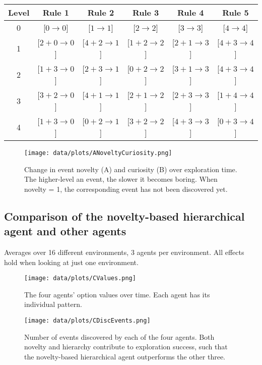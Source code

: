 \documentclass{article}
\begin{document}
\begin{center}
 \begin{tabular}{|c | c c c c c|} 
 \hline
 Level & Rule 1 & Rule 2 & Rule 3 & Rule 4 & Rule 5 \\ [0.5ex] 
 \hline
 0 & [$0 \rightarrow 0$] & [$1 \rightarrow 1$] & [$2 \rightarrow 2$] & [$3 \rightarrow 3$] & [$4 \rightarrow 4$] \\ 
 \hline
 1 & [$2 + 0 \rightarrow 0$] & [$4 + 2 \rightarrow 1$] & [$1 + 2 \rightarrow 2$] & [$2 + 1 \rightarrow 3$] & [$4 + 3 \rightarrow 4$] \\ 
 \hline
 2 & [$1 + 3 \rightarrow 0$] & [$2 + 3 \rightarrow 1$] & [$0 + 2 \rightarrow 2$] & [$3 + 1 \rightarrow 3$] & [$4 + 3 \rightarrow 4$] \\ 
 \hline
 3 & [$3 + 2 \rightarrow 0$] & [$4 + 1 \rightarrow 1$] & [$2 + 1 \rightarrow 2$] & [$2 + 3 \rightarrow 3$] & [$1 + 4 \rightarrow 4$] \\ 
 \hline
 4 & [$1 + 3 \rightarrow 0$] & [$0 + 2 \rightarrow 1$] & [$3 + 2 \rightarrow 2$] & [$4 + 3 \rightarrow 3$] & [$0 + 3 \rightarrow 4$] \\ 
 \hline
 \end{tabular}
\end{center}

\begin{figure}[h]
	\centering
	\texttt{[image: data/plots/ANoveltyCuriosity.png]}
	\caption{Change in event novelty (A) and curiosity (B) over exploration time. The higher-level an event, the slower it becomes boring. When novelty = 1, the corresponding event has not been discovered yet.}
	\label{TaskFigure}
\end{figure}

\subsection{Comparison of the novelty-based hierarchical agent and other agents}

Averages over 16 different environments, 3 agents per environment. All effects hold when looking at just one environment.

\begin{figure}[h]
	\centering
	\texttt{[image: data/plots/CValues.png]}
	\caption{The four agents' option values over time. Each agent has its individual pattern.}
	\label{TaskFigure}
\end{figure}

\begin{figure}[h]
	\centering
	\texttt{[image: data/plots/CDiscEvents.png]}
	\caption{Number of events discovered by each of the four agents. Both novelty and hierarchy contribute to exploration success, such that the novelty-based hierarchical agent outperforms the other three.}
	\label{TaskFigure}
\end{figure}
\end{document}
